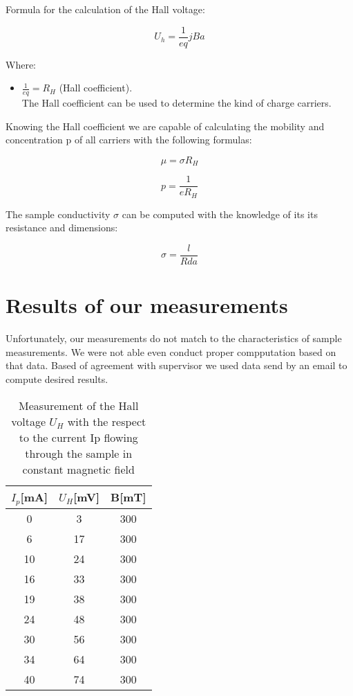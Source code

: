 \documentclass[a4paper,12pt]{article}
\begin{document}
Formula for the calculation of the Hall voltage:

\begin{equation}
U_h = \frac{1}{eq}jBa
\end{equation}

Where:
\begin{itemize}
\item $\frac{1}{eq} = R_H$ (Hall coefficient). \\The Hall coefficient can be used to determine the kind of
charge carriers.
\end{itemize}

Knowing the Hall coefficient we are capable of calculating the mobility  and concentration p of all carriers with the following formulas:

\begin{equation}
\mu = \sigma R_H
\end{equation}

\begin{equation}
p = \frac{1}{eR_H}
\end{equation}

The sample conductivity $\sigma$ can be computed with the knowledge of its its resistance and dimensions:

\begin{equation}
\sigma = \frac{l}{Rda}
\end{equation}

\newpage

\section{Results of our measurements}

Unfortunately, our measurements do not match to the characteristics of sample measurements. We were not able even conduct proper compputation based on that data. Based of agreement with supervisor we used data send by an email to compute desired results.

\begin{table}[H]
\begin{center}
\caption{Measurement of the Hall voltage $U_H$ with the respect to the current Ip flowing through the sample in constant magnetic field}
\begin{tabular}{|c|c|c|}
\hline
$I_p$[mA] & $U_H$[mV] & B[mT] \\   
\hline
\hline
0 &	3   & 300 \\
\hline
6 &	17  & 300 \\
\hline
10 &	24  & 300 \\
\hline
16 &	33  & 300 \\
\hline
19 &	38  & 300 \\
\hline
24 &	48  & 300 \\
\hline
30 &	56  & 300 \\
\hline
34 &	64  & 300 \\
\hline
40 &	74  & 300 \\
\hline
\end{tabular}
\end{center}
\end{table}
\end{document}
